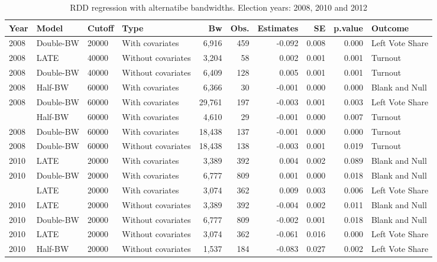 \documentclass[12pt,]{article}
\begin{document}
\begin{landscape}\begin{table}[!h]

\caption{\label{tab:r.sig}RDD regression with alternatibe bandwidths. Election years: 2008, 2010 and 2012}
\centering
\fontsize{10}{12}\selectfont
\begin{tabular}{llllrrrrrl}
\toprule
Year & Model & Cutoff & Type & Bw & Obs. & Estimates & SE & p.value & Outcome\\
\midrule
2008 & Double-BW & 20000 & With covariates & 6,916 & 459 & -0.092 & 0.008 & 0.000 & Left Vote Share\\
2008 & LATE & 40000 & Without covariates & 3,204 & 58 & 0.002 & 0.001 & 0.001 & Turnout\\
2008 & Double-BW & 40000 & Without covariates & 6,409 & 128 & 0.005 & 0.001 & 0.001 & Turnout\\
2008 & Half-BW & 60000 & With covariates & 6,366 & 30 & -0.001 & 0.000 & 0.000 & Blank and Null\\
2008 & Double-BW & 60000 & With covariates & 29,761 & 197 & -0.003 & 0.001 & 0.003 & Left Vote Share\\
\addlinespace
2008 & Half-BW & 60000 & With covariates & 4,610 & 29 & -0.001 & 0.000 & 0.007 & Turnout\\
2008 & Double-BW & 60000 & With covariates & 18,438 & 137 & -0.001 & 0.000 & 0.000 & Turnout\\
2008 & Double-BW & 60000 & Without covariates & 18,438 & 138 & -0.003 & 0.001 & 0.019 & Turnout\\
2010 & LATE & 20000 & With covariates & 3,389 & 392 & 0.004 & 0.002 & 0.089 & Blank and Null\\
2010 & Double-BW & 20000 & With covariates & 6,777 & 809 & 0.001 & 0.000 & 0.018 & Blank and Null\\
\addlinespace
2010 & LATE & 20000 & With covariates & 3,074 & 362 & 0.009 & 0.003 & 0.006 & Left Vote Share\\
2010 & LATE & 20000 & Without covariates & 3,389 & 392 & -0.004 & 0.002 & 0.011 & Blank and Null\\
2010 & Double-BW & 20000 & Without covariates & 6,777 & 809 & -0.002 & 0.001 & 0.018 & Blank and Null\\
2010 & LATE & 20000 & Without covariates & 3,074 & 362 & -0.061 & 0.016 & 0.000 & Left Vote Share\\
2010 & Half-BW & 20000 & Without covariates & 1,537 & 184 & -0.083 & 0.027 & 0.002 & Left Vote Share\\

\end{tabular}
\end{table}
\end{landscape}
\end{document}
